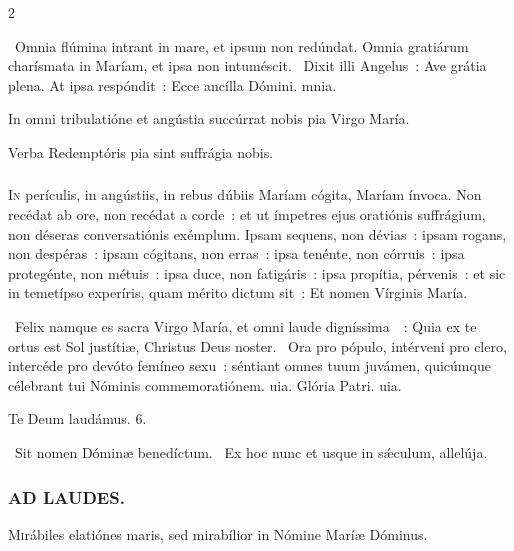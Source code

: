 \documentclass[9pt,twoside]{extarticle}
\begin{document}
\begin{multicols}{2}
{\begin{tightlist}{}
\item {}~Omnia flúmina intrant in mare, et ipsum non redúndat. \textred{*} Omnia gratiárum charísmata in Maríam, et ipsa non intuméscit. ~Dixit illi Angelus~: Ave grátia plena. At ipsa respóndit~: Ecce ancílla Dómini. mnia.
\item {\small {} In omni tribulatióne et angústia succúrrat nobis pia Virgo María.}
\item {\small {}}
\item {\small {} Verba Redemptóris pia sint suffrágia nobis.}
\end{tightlist}

\subsubsection*{\center {}}
\lettrine{I}n perículis, in angústiis, in rebus dúbiis Maríam cógita, Maríam ínvoca. Non recédat ab ore, non recédat a corde~: et ut ímpetres ejus oratiónis suffrágium, non déseras conversatiónis exémplum. Ipsam sequens, non dévias~: ipsam rogans, non despéras~: ipsam cógitans, non erras~: ipsa tenénte, non córruis~: ipsa protegénte, non métuis~: ipsa duce, non fatigáris~: ipsa propítia, pérvenis~: et sic in temetípso experíris, quam mérito dictum sit~: Et nomen Vírginis María.

\begin{tightlist}{}
\item {}~Felix namque es sacra Virgo María, et omni laude digníssima~~: \textred{*} Quia ex te ortus est Sol justítiæ, Christus Deus noster. ~Ora pro pópulo, intérveni pro clero, intercéde pro devóto femíneo sexu~: séntiant omnes tuum juvámen, quicúmque célebrant tui Nóminis commemoratiónem. uia. Glória Patri. uia.
\item Te Deum laudámus. 6.
\item {}~Sit nomen Dóminæ benedíctum. ~Ex hoc nunc et usque in sǽculum, allelúja.
\end{tightlist}

\subsubsection*{\center \textsc{AD LAUDES.}}
\begin{center}\end{center}
\lettrine{M}irábiles elatiónes maris, sed mirabílior in Nómine Maríæ Dóminus.

}
\end{multicols}
\end{document}
